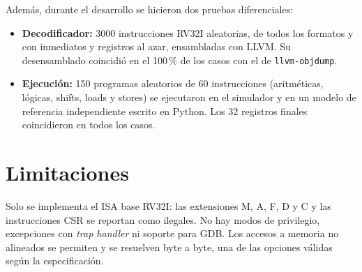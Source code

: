 \documentclass[11pt,a4paper]{article}
\newcommand{\cmd}[1]{\texttt{#1}}
\begin{document}
Además, durante el desarrollo se hicieron dos pruebas diferenciales:
\begin{itemize}
  \item \textbf{Decodificador:} 3000 instrucciones RV32I aleatorias, de todos los formatos y con inmediatos y
        registros al azar, ensambladas con LLVM. Su desensamblado coincidió en el 100\,\% de los casos con el de
        \cmd{llvm-objdump}.
  \item \textbf{Ejecución:} 150 programas aleatorios de 60 instrucciones (aritméticas, lógicas, shifts, loads y
        stores) se ejecutaron en el simulador y en un modelo de referencia independiente escrito en Python. Los
        32 registros finales coincidieron en todos los casos.
\end{itemize}

\section{Limitaciones}
Solo se implementa el ISA base RV32I: las extensiones M, A, F, D y C y las instrucciones CSR se reportan como
ilegales. No hay modos de privilegio, excepciones con \emph{trap handler} ni soporte para GDB. Los accesos a
memoria no alineados se permiten y se resuelven byte a byte, una de las opciones válidas según la especificación.
\end{document}
